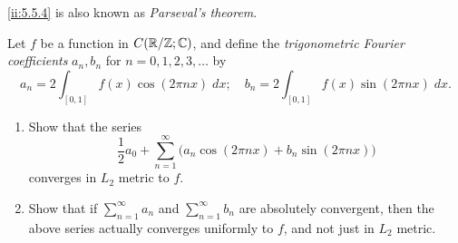 \begin{note}
  \cref{ii:5.5.4} is also known as \emph{Parseval's theorem}.
\end{note}

\exercisesection

\begin{ex}\label{ii:ex:5.5.1}
  Let \(f\) be a function in \(C(\mathbb{R} / \mathbb{Z} ; \mathbb{C})\), and define the \emph{trigonometric Fourier coefficients} \(a_n, b_n\) for \(n = 0, 1, 2, 3, \dots\) by
  \[
    a_n = 2 \int_{[0, 1]} f(x) \cos(2 \pi n x) \; dx; \quad b_n = 2 \int_{[0, 1]} f(x) \sin(2 \pi n x) \; dx.
  \]
  \begin{enumerate}
    \item Show that the series
          \[
            \dfrac{1}{2} a_0 + \sum_{n = 1}^\infty \big(a_n \cos(2 \pi n x) + b_n \sin(2 \pi n x)\big)
          \]
          converges in \(L_2\) metric to \(f\).
    \item Show that if \(\sum_{n = 1}^\infty a_n\) and \(\sum_{n = 1}^\infty b_n\) are absolutely convergent, then the above series actually converges uniformly to \(f\), and not just in \(L_2\) metric.
  \end{enumerate}
\end{ex}

